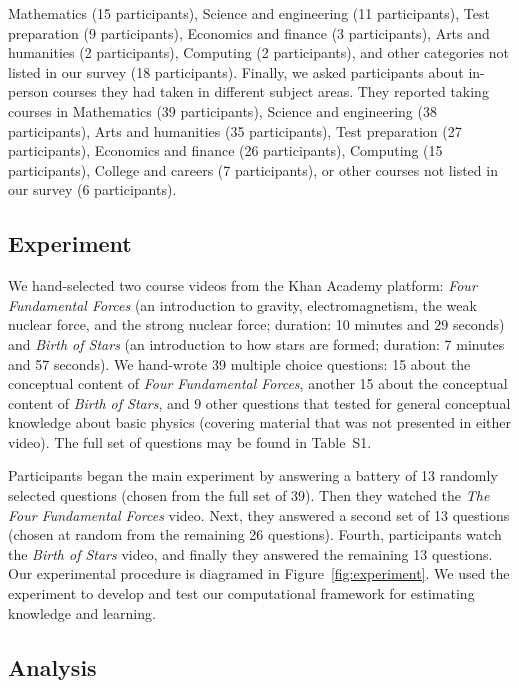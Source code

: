 \documentclass[10pt]{article}
\newcommand{\questions}{S1}
\begin{document}
Mathematics (15 participants), Science and engineering (11 participants), Test
preparation (9 participants), Economics and finance (3 participants), Arts and
humanities (2 participants), Computing (2 participants), and other categories
not listed in our survey (18 participants). Finally, we asked participants
about in-person courses they had taken in different subject areas. They
reported taking courses in Mathematics (39 participants), Science and
engineering (38 participants), Arts and humanities (35 participants), Test
preparation (27 participants), Economics and finance (26 participants),
Computing (15 participants), College and careers (7 participants), or other
courses not listed in our survey (6 participants).


\subsection*{Experiment}

We hand-selected two course videos from the Khan Academy platform: \textit{Four
Fundamental Forces} (an introduction to gravity, electromagnetism, the weak
nuclear force, and the strong nuclear force; duration: 10 minutes and 29
seconds) and \textit{Birth of Stars} (an introduction to how stars are formed;
duration: 7 minutes and 57 seconds). We hand-wrote 39 multiple choice
questions: 15 about the conceptual content of \textit{Four Fundamental Forces},
another 15 about the conceptual content of \textit{Birth of Stars}, and 9 other
questions that tested for general conceptual knowledge about basic physics
(covering material that was not presented in either video). The full set of
questions may be found in Table~\questions.



Participants began the main experiment by answering a battery of 13 randomly
selected questions (chosen from the full set of 39). Then they watched the
\textit{The Four Fundamental Forces} video. Next, they answered a second set of
13 questions (chosen at random from the remaining 26 questions). Fourth,
participants watch the \textit{Birth of Stars} video, and finally they answered
the remaining 13 questions. Our experimental procedure is diagramed in
Figure~\ref{fig:experiment}. We used the experiment to develop and test our
computational framework for estimating knowledge and learning.

\subsection*{Analysis}
\end{document}
